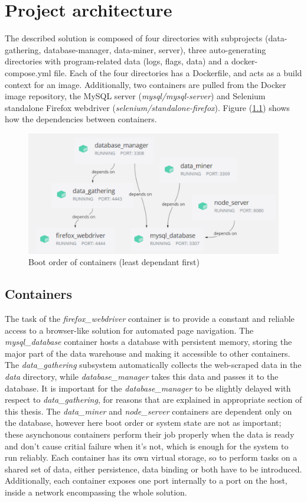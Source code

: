 \chapter{Project architecture}
\label{ch:architecture}
The described solution is composed of four directories with subprojects (data-gathering, database-manager, data-miner, server), three auto-generating directories with program-related data (logs, flags, data) and a docker-compose.yml file. Each of the four directories has a Dockerfile, and acts as a build context for an image. Additionally, two containers are pulled from the Docker image repository, the MySQL server (\textit{mysql/mysql-server}) and Selenium standalone Firefox webdriver (\textit{selenium/standalone-firefox}).
Figure (\ref{arch:container_dependencies}) shows how the dependencies between containers.

\begin{figure}[h!]
    \centering
    \includegraphics[width=\textwidth]{figures/container_dependencies.png}
    \caption{Boot order of containers (least dependant first)}
    \label{arch:container_dependencies}
\end{figure}

\section{Containers}
The task of the \textit{firefox\_webdriver} container is to provide a constant and reliable access to a browser-like solution for automated page navigation. The \textit{mysql\_database} container hosts a database with persistent memory, storing the major part of the data warehouse and making it accessible to other containers. The \textit{data\_gathering} subsystem automatically collects the web-scraped data in the \textit{data} directory, while \textit{database\_manager} takes this data and passes it to the database. It is important for the \textit{database\_manager} to be slightly delayed with respect to \textit{data\_gathering}, for reasons that are explained in appropriate section of this thesis. The \textit{data\_miner} and \textit{node\_server} containers are dependent only on the database, however here boot order or system state are not as important; these asynchonous containers perform their job properly when the data is ready and don't cause critial failure when it's not, which is enough for the system to run reliably.
Each container has its own virtual storage, so to perform tasks on a shared set of data, either persistence, data binding or both have to be introduced. Additionally, each container exposes one port internally to a port on the host, inside a network encompassing the whole solution.


